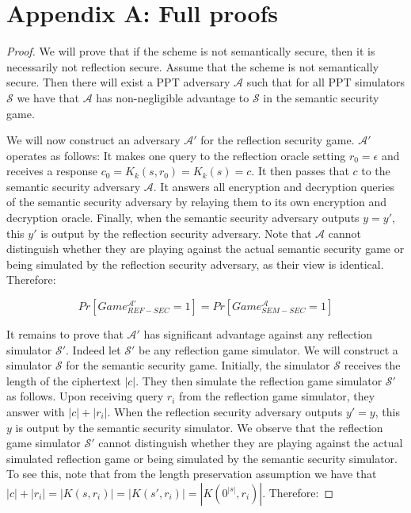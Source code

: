 \section*{Appendix A: Full proofs}

\begin{lemma}
\end{lemma}

\begin{proof}
    We will prove that if the scheme is not semantically secure, then it is
    necessarily not reflection secure. Assume that the scheme is not
    semantically secure. Then there will exist a PPT adversary $\mathcal{A}$
    such that for all PPT simulators $\mathcal{S}$ we have that $\mathcal{A}$
    has non-negligible advantage to $\mathcal{S}$ in the semantic security game.

    We will now construct an adversary $\mathcal{A'}$ for the reflection
    security game. $\mathcal{A'}$ operates as follows: It makes one query to
    the reflection oracle setting $r_0 = \epsilon$ and receives a response $c_0
    = K_k(s, r_0) = K_k(s) = c$. It then passes that $c$ to the semantic
    security adversary $\mathcal{A}$. It answers all encryption and decryption
    queries of the semantic security adversary by relaying them to its own
    encryption and decryption oracle. Finally, when the semantic security
    adversary outputs $y = y'$, this $y'$ is output by the reflection security
    adversary. Note that $\mathcal{A}$ cannot distinguish whether they are
    playing against the actual semantic security game or being simulated by the
    reflection security adversary, as their view is identical. Therefore:

    \begin{equation}
        Pr[Game_{REF-SEC}^{\mathcal{A'}} = 1] = Pr[Game_{SEM-SEC}^{\mathcal{A}} = 1]
    \end{equation}

    It remains to prove that $\mathcal{A'}$ has significant advantage against
    any reflection simulator $\mathcal{S'}$. Indeed let $\mathcal{S'}$ be any
    reflection game simulator. We will construct a simulator $\mathcal{S}$ for
    the semantic security game. Initially, the simulator $\mathcal{S}$ receives
    the length of the ciphertext $|c|$. They then simulate the reflection game
    simulator $\mathcal{S'}$ as follows. Upon receiving query $r_i$ from the
    reflection game simulator, they answer with $|c| + |r_i|$. When the
    reflection security adversary outputs $y' = y$, this $y$ is output by the
    semantic security simulator. We observe that the reflection game simulator
    $\mathcal{S'}$ cannot distinguish whether they are playing against the
    actual simulated reflection game or being simulated by the semantic
    security simulator. To see this, note that from the length preservation
    assumption we have that $|c| + |r_i| = |K(s, r_i)| = |K(s', r_i)| =
    |K(0^{|s|}, r_i)|$. Therefore:


\end{proof}
